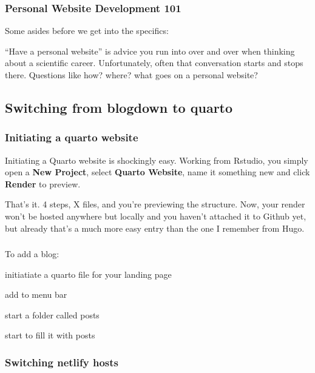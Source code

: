 \documentclass[
  letterpaper,
  DIV=11,
  numbers=noendperiod,
  oneside]{scrartcl}
\begin{document}
\hypertarget{personal-website-development-101}{%
\subsubsection{Personal Website Development
101}\label{personal-website-development-101}}

Some asides before we get into the specifics:

``Have a personal website'' is advice you run into over and over when
thinking about a scientific career. Unfortunately, often that
conversation starts and stops there. Questions like how? where? what
goes on a personal website?

\hypertarget{switching-from-blogdown-to-quarto}{%
\subsection{Switching from blogdown to
quarto}\label{switching-from-blogdown-to-quarto}}

\hypertarget{initiating-a-quarto-website}{%
\subsubsection{Initiating a quarto
website}\label{initiating-a-quarto-website}}

Initiating a Quarto website is shockingly easy. Working from Rstudio,
you simply open a \textbf{New Project}, select \textbf{Quarto Website},
name it something new and click \textbf{Render} to preview.

That's it. 4 steps, X files, and you're previewing the structure. Now,
your render won't be hosted anywhere but locally and you haven't
attached it to Github yet, but already that's a much more easy entry
than the one I remember from Hugo.

\hypertarget{section}{%
\subsubsection{}\label{section}}

To add a blog:

initiatiate a quarto file for your landing page

add to menu bar

start a folder called posts

start to fill it with posts

\hypertarget{switching-netlify-hosts}{%
\subsubsection{Switching netlify hosts}\label{switching-netlify-hosts}}
\end{document}
